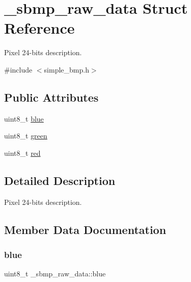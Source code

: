 \hypertarget{struct__sbmp__raw__data}{}\section{\+\_\+sbmp\+\_\+raw\+\_\+data Struct Reference}
\label{struct__sbmp__raw__data}


Pixel 24-\/bits description.  




{\ttfamily \#include $<$simple\+\_\+bmp.\+h$>$}

\subsection*{Public Attributes}
\begin{DoxyCompactItemize}
\item 
uint8\+\_\+t \hyperlink{struct__sbmp__raw__data_a129427120773890e3b6f2bef7919163b}{blue}
\item 
uint8\+\_\+t \hyperlink{struct__sbmp__raw__data_ae56f0b7b9d0be1413777531d6f398e06}{green}
\item 
uint8\+\_\+t \hyperlink{struct__sbmp__raw__data_a242c14e8cabe5016356aee032e25a7a3}{red}
\end{DoxyCompactItemize}


\subsection{Detailed Description}
Pixel 24-\/bits description. 

\subsection{Member Data Documentation}
\mbox{\label{struct__sbmp__raw__data_a129427120773890e3b6f2bef7919163b}} 
\subsubsection{\texorpdfstring{blue}{blue}}
{\footnotesize\ttfamily uint8\+\_\+t \+\_\+sbmp\+\_\+raw\+\_\+data\+::blue}

\mbox{\label{struct__sbmp__raw__data_ae56f0b7b9d0be1413777531d6f398e06}} 
